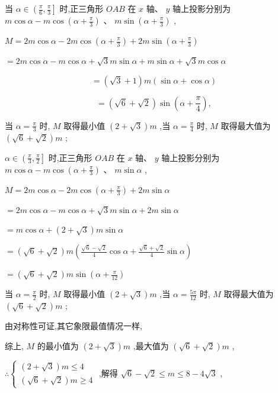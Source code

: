 \documentclass[10pt]{article}
\begin{document}
当 \(\alpha  \in  \left( {\frac{\pi }{6},\frac{\pi }{3}}\right\rbrack\) 时,正三角形 \({OAB}\) 在 \(x\) 轴、 \(y\) 轴上投影分别为 \(m\cos \alpha  - m\cos \left( {\alpha  + \frac{\pi }{3}}\right) \text{ 、 }m\sin \left( {\alpha  + \frac{\pi }{3}}\right)\) ,

\(M = {2m}\cos \alpha  - {2m}\cos \left( {\alpha  + \frac{\pi }{3}}\right)  + {2m}\sin \left( {\alpha  + \frac{\pi }{3}}\right)\)

\(= {2m}\cos \alpha  - m\cos \alpha  + \sqrt{3}m\sin \alpha  + m\sin \alpha  + \sqrt{3}m\cos \alpha\)

\[
= \left( {\sqrt{3} + 1}\right) m\left( {\sin \alpha  + \cos \alpha }\right)
\]

\[
= \left( {\sqrt{6} + \sqrt{2}}\right) \sin \left( {\alpha  + \frac{\pi }{4}}\right) ,
\]

当 \(\alpha  = \frac{\pi }{3}\) 时, \(M\) 取得最小值 \(\left( {2 + \sqrt{3}}\right) m\) ,当 \(\alpha  = \frac{\pi }{4}\) 时, \(M\) 取得最大值为 \(\left( {\sqrt{6} + \sqrt{2}}\right) m\) ;

\(\alpha  \in  \left( {\frac{\pi }{3},\frac{\pi }{2}}\right\rbrack\) 时,正三角形 \({OAB}\) 在 \(x\) 轴、 \(y\) 轴上投影分别为 \(m\cos \alpha  - m\cos \left( {\alpha  + \frac{\pi }{3}}\right) \text{ 、 }m\sin \alpha\) ,

\(M = {2m}\cos \alpha  - {2m}\cos \left( {\alpha  + \frac{\pi }{3}}\right)  + {2m}\sin \alpha\)

\(= {2m}\cos \alpha  - m\cos \alpha  + \sqrt{3}m\sin \alpha  + {2m}\sin \alpha\)

\(= m\cos \alpha  + \left( {2 + \sqrt{3}}\right) m\sin \alpha\)

\(= \left( {\sqrt{6} + \sqrt{2}}\right) m\left( {\frac{\sqrt{6} - \sqrt{2}}{4}\cos \alpha  + \frac{\sqrt{6} + \sqrt{2}}{4}\sin \alpha }\right)\)

\(= \left( {\sqrt{6} + \sqrt{2}}\right) m\sin \left( {\alpha  + \frac{\pi }{12}}\right)\)

当 \(\alpha  = \frac{\pi }{2}\) 时, \(M\) 取得最小值 \(\left( {2 + \sqrt{3}}\right) m\) ,当 \(\alpha  = \frac{5\pi }{12}\) 时, \(M\) 取得最大值为 \(\left( {\sqrt{6} + \sqrt{2}}\right) m\) ;

由对称性可证,其它象限最值情况一样,

综上, \(M\) 的最小值为 \(\left( {2 + \sqrt{3}}\right) m\) ,最大值为 \(\left( {\sqrt{6} + \sqrt{2}}\right) m\) ,

\(\therefore \left\{  \begin{array}{l} \left( {2 + \sqrt{3}}\right) m \leq  4 \\  \left( {\sqrt{6} + \sqrt{2}}\right) m \geq  4 \end{array}\right.\) ,解得 \(\sqrt{6} - \sqrt{2} \leq  m \leq  8 - 4\sqrt{3}\) ,
\end{document}
